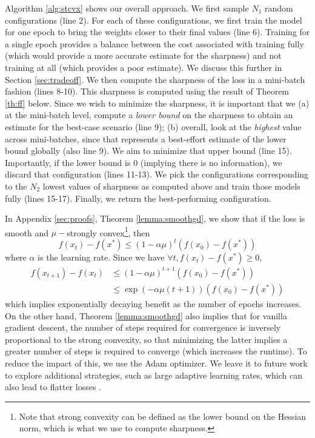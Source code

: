 \documentclass[preprint,12pt]{elsarticle}
\begin{document}
Algorithm \ref{alg:stcvx} shows our overall approach. We first sample $N_1$ random configurations (line 2). For each of these configurations, we first train the model for one epoch to bring the weights closer to their final values (line 6). Training for a single epoch provides a balance between the cost associated with training fully (which would provide a more accurate estimate for the sharpness) and not training at all (which provides a poor estimate). We discuss this further in Section \ref{sec:tradeoff}. We then compute the sharpness of the loss in a mini-batch fashion (lines 8-10). This sharpness is computed using the result of Theorem \ref{th:ff} below. Since we wish to minimize the sharpness, it is important that we (a) at the mini-batch level, compute a \textit{lower bound} on the sharpness to obtain an estimate for the best-case scenario (line 9); (b) overall, look at the \textit{highest} value across mini-batches, since that represents a best-effort estimate of the lower bound globally (also line 9). We aim to minimize that upper bound (line 15). Importantly, if the lower bound is 0 (implying there is no information), we discard that configuration (lines 11-13). We pick the configurations corresponding to the $N_2$ lowest values of sharpness as computed above and train those models fully (lines 15-17). Finally, we return the best-performing configuration. 

In Appendix \ref{sec:proofs}, Theorem \ref{lemma:smoothgd}, we show that if the loss is smooth and $\mu-$strongly convex\footnote{Note that strong convexity can be defined as the lower bound on the Hessian norm, which is what we use to compute sharpness.}, then 
$$
f(x_t) - f(x^*) \leq ( 1 - \alpha \mu )^t \left( f(x_0) - f(x^*) \right)
$$
where $\alpha$ is the learning rate. Since we have $\forall t, f(x_t) - f(x^*) \geq 0$,
\begin{equation*}
        \begin{aligned}
            f(x_{t+1}) - f(x_t) &\leq (1 - \alpha \mu)^{t+1} \left( f(x_0) - f(x^*) \right) \\
                &\leq \exp(-\alpha \mu (t+1)) \left( f(x_0) - f(x^*) \right)
        \end{aligned}
\end{equation*}
which implies exponentially decaying benefit as the number of epochs increases. On the other hand, Theorem \ref{lemma:smoothgd} also implies that for vanilla gradient descent, the number of steps required for convergence is inversely proportional to the strong convexity, so that minimizing the latter implies a greater number of steps is required to converge (which increases the runtime). To reduce the impact of this, we use the Adam \cite{kingma2014adam} optimizer. We leave it to future work to explore additional strategies, such as large adaptive learning rates, which can also lead to flatter losses \cite{jastrzkebski2017three}.
\end{document}
